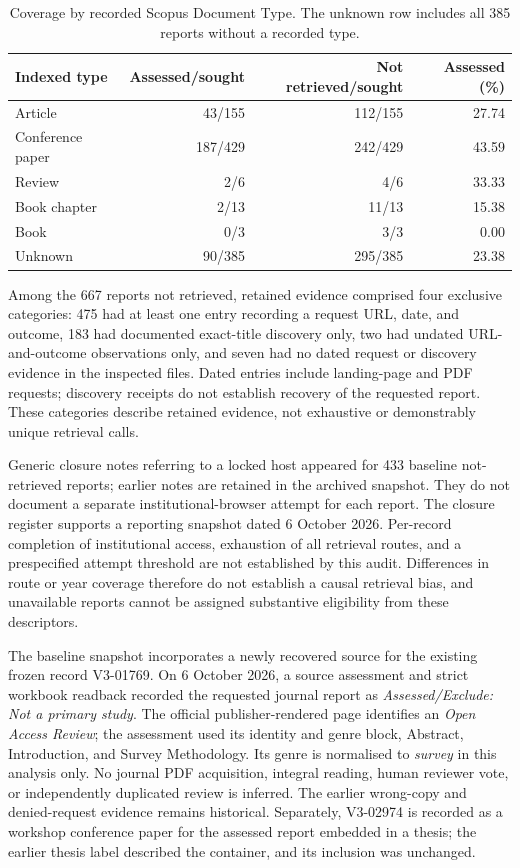 \documentclass[manuscript,review,screen]{acmart}
\begin{document}
\begin{table}[htbp]
\centering
\caption{Coverage by recorded Scopus Document Type. The unknown row includes all 385 reports without a recorded type.}
\label{tab:indexed-type-coverage-proposal}
\begin{tabular}{lrrr}
\hline
Indexed type & Assessed/sought & Not retrieved/sought & Assessed (\%) \\
\hline
Article & 43/155 & 112/155 & 27.74 \\
Conference paper & 187/429 & 242/429 & 43.59 \\
Review & 2/6 & 4/6 & 33.33 \\
Book chapter & 2/13 & 11/13 & 15.38 \\
Book & 0/3 & 3/3 & 0.00 \\
Unknown & 90/385 & 295/385 & 23.38 \\
\hline
\end{tabular}
\end{table}

Among the 667 reports not retrieved, retained evidence comprised four exclusive categories: 475 had at least one entry recording a request URL, date, and outcome, 183 had documented exact-title discovery only, two had undated URL-and-outcome observations only, and seven had no dated request or discovery evidence in the inspected files. Dated entries include landing-page and PDF requests; discovery receipts do not establish recovery of the requested report. These categories describe retained evidence, not exhaustive or demonstrably unique retrieval calls.

Generic closure notes referring to a locked host appeared for 433 baseline not-retrieved reports; earlier notes are retained in the archived snapshot. They do not document a separate institutional-browser attempt for each report. The closure register supports a reporting snapshot dated 6 October 2026. Per-record completion of institutional access, exhaustion of all retrieval routes, and a prespecified attempt threshold are not established by this audit. Differences in route or year coverage therefore do not establish a causal retrieval bias, and unavailable reports cannot be assigned substantive eligibility from these descriptors.


The baseline snapshot incorporates a newly recovered source for the existing frozen record V3-01769. On 6 October 2026, a source assessment and strict workbook readback recorded the requested journal report as \textit{Assessed/Exclude: Not a primary study}. The official publisher-rendered page identifies an \textit{Open Access Review}; the assessment used its identity and genre block, Abstract, Introduction, and Survey Methodology. Its genre is normalised to \textit{survey} in this analysis only. No journal PDF acquisition, integral reading, human reviewer vote, or independently duplicated review is inferred. The earlier wrong-copy and denied-request evidence remains historical. Separately, V3-02974 is recorded as a workshop conference paper for the assessed report embedded in a thesis; the earlier thesis label described the container, and its inclusion was unchanged.
\end{document}
